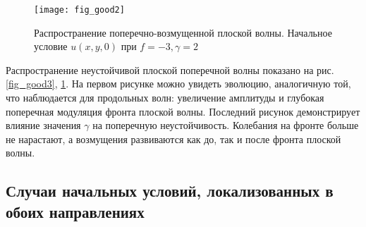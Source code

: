 \begin{figure}
	\centering
	\texttt{[image: fig\_good2]}
	\caption{Распространение поперечно-возмущенной плоской волны. Начальное условие $u(x,y,0)$ при $f = -3, \gamma = 2$} \label{fig_good2}
\end{figure}

Распространение неустойчивой плоской поперечной волны показано на рис.~ \ref {fig_good3}, \ref{fig_good2}. На первом рисунке можно увидеть эволюцию, аналогичную той, что наблюдается для продольных волн: увеличение амплитуды и глубокая поперечная модуляция фронта плоской волны. Последний рисунок демонстрирует влияние значения $ \gamma $ на поперечную неустойчивость. Колебания на фронте больше не нарастают, а возмущения развиваются как до, так и после фронта плоской волны.



\subsection{Случаи начальных условий, локализованных в обоих направлениях}

